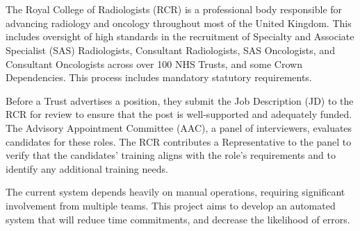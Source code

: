 \section*{}
\vspace{10pt}

The Royal College of Radiologists (RCR) is a professional body responsible for advancing radiology and oncology throughout most of the United Kingdom. This includes oversight of high standards in the recruitment of Specialty and Associate Specialist (SAS) Radiologists, Consultant Radiologists, SAS Oncologists, and Consultant Oncologists across over 100 NHS Trusts, and some Crown Dependencies. This process includes mandatory statutory requirements.

Before a Trust advertises a position, they submit the Job Description (JD) to the RCR for review to ensure that the post is well-supported and adequately funded. The Advisory Appointment Committee (AAC), a panel of interviewers, evaluates candidates for these roles. The RCR contributes a Representative to the panel to verify that the candidates' training aligns with the role's requirements and to identify any additional training needs.

The current system depends heavily on manual operations, requiring significant involvement from multiple teams. This project aims to develop an automated system that will reduce time commitments, and decrease the likelihood of errors.